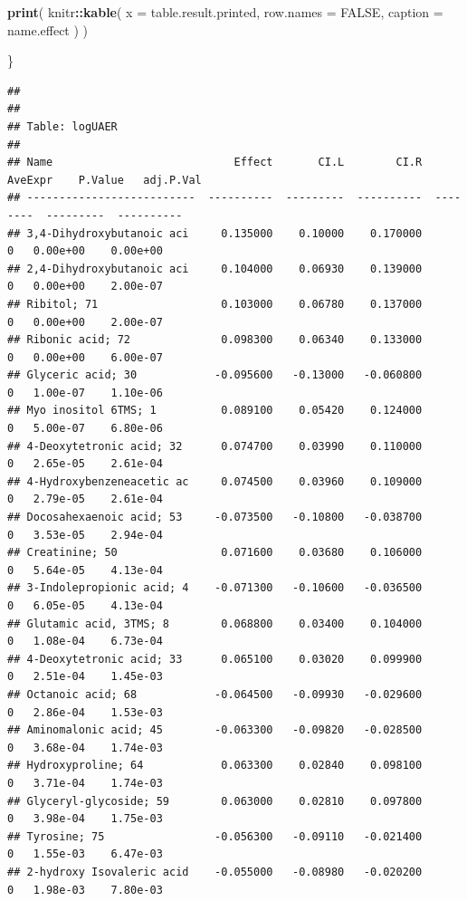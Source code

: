 \documentclass[]{article}
\newenvironment{Shaded}{\begin{snugshade}}{\end{snugshade}}
\newcommand{\DataTypeTok}[1]{\textcolor[rgb]{0.13,0.29,0.53}{#1}}
\newcommand{\KeywordTok}[1]{\textcolor[rgb]{0.13,0.29,0.53}{\textbf{#1}}}
\newcommand{\NormalTok}[1]{#1}
\newcommand{\OperatorTok}[1]{\textcolor[rgb]{0.81,0.36,0.00}{\textbf{#1}}}
\newcommand{\OtherTok}[1]{\textcolor[rgb]{0.56,0.35,0.01}{#1}}
\begin{document}
\begin{Shaded}
\begin{Highlighting}[]
  \KeywordTok{print}\NormalTok{(}
\NormalTok{    knitr}\OperatorTok{::}\KeywordTok{kable}\NormalTok{( }
      \DataTypeTok{x =}\NormalTok{ table.result.printed,}
      \DataTypeTok{row.names =} \OtherTok{FALSE}\NormalTok{,}
      \DataTypeTok{caption =}\NormalTok{ name.effect}
\NormalTok{    )}
\NormalTok{  )}
  
\NormalTok{\}}
\end{Highlighting}
\end{Shaded}

\begin{verbatim}
## 
## 
## Table: logUAER
## 
## Name                            Effect       CI.L        CI.R   AveExpr    P.Value   adj.P.Val
## --------------------------  ----------  ---------  ----------  --------  ---------  ----------
## 3,4-Dihydroxybutanoic aci     0.135000    0.10000    0.170000         0   0.00e+00    0.00e+00
## 2,4-Dihydroxybutanoic aci     0.104000    0.06930    0.139000         0   0.00e+00    2.00e-07
## Ribitol; 71                   0.103000    0.06780    0.137000         0   0.00e+00    2.00e-07
## Ribonic acid; 72              0.098300    0.06340    0.133000         0   0.00e+00    6.00e-07
## Glyceric acid; 30            -0.095600   -0.13000   -0.060800         0   1.00e-07    1.10e-06
## Myo inositol 6TMS; 1          0.089100    0.05420    0.124000         0   5.00e-07    6.80e-06
## 4-Deoxytetronic acid; 32      0.074700    0.03990    0.110000         0   2.65e-05    2.61e-04
## 4-Hydroxybenzeneacetic ac     0.074500    0.03960    0.109000         0   2.79e-05    2.61e-04
## Docosahexaenoic acid; 53     -0.073500   -0.10800   -0.038700         0   3.53e-05    2.94e-04
## Creatinine; 50                0.071600    0.03680    0.106000         0   5.64e-05    4.13e-04
## 3-Indolepropionic acid; 4    -0.071300   -0.10600   -0.036500         0   6.05e-05    4.13e-04
## Glutamic acid, 3TMS; 8        0.068800    0.03400    0.104000         0   1.08e-04    6.73e-04
## 4-Deoxytetronic acid; 33      0.065100    0.03020    0.099900         0   2.51e-04    1.45e-03
## Octanoic acid; 68            -0.064500   -0.09930   -0.029600         0   2.86e-04    1.53e-03
## Aminomalonic acid; 45        -0.063300   -0.09820   -0.028500         0   3.68e-04    1.74e-03
## Hydroxyproline; 64            0.063300    0.02840    0.098100         0   3.71e-04    1.74e-03
## Glyceryl-glycoside; 59        0.063000    0.02810    0.097800         0   3.98e-04    1.75e-03
## Tyrosine; 75                 -0.056300   -0.09110   -0.021400         0   1.55e-03    6.47e-03
## 2-hydroxy Isovaleric acid    -0.055000   -0.08980   -0.020200         0   1.98e-03    7.80e-03

\end{verbatim}
\end{document}
